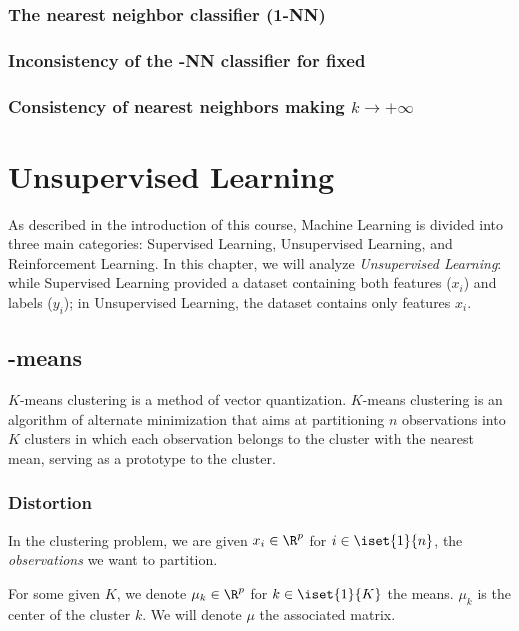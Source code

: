 \documentclass[toc, titlepaged]{../cs-classes/cs-classes}
\begin{document}
\subsubsection{The nearest neighbor classifier (1-NN)}

\subsubsection{Inconsistency of the -NN classifier for fixed }

\subsubsection{Consistency of nearest neighbors making \texorpdfstring{$k\rightarrow+\infty$}{k→+∞}}

\section{Unsupervised Learning}
As described in the introduction of this course, Machine Learning is divided into three main categories: Supervised Learning, Unsupervised Learning, and Reinforcement Learning. In this chapter, we will analyze \emph{Unsupervised Learning}: while Supervised Learning provided a dataset containing both features ($x_i$) and labels ($y_i$); in Unsupervised Learning, the dataset contains only features $x_i$.

\subsection{-means}
$K$-means clustering is a method of vector quantization. $K$-means clustering is an algorithm of alternate minimization that aims at partitioning $n$ observations into $K$ clusters in which each observation belongs to the cluster with the nearest mean, serving as a prototype to the cluster.


\subsubsection{Distortion}
\begin{definition}[Observations]
    In the clustering problem, we are given $x_i\in\R^p$ for $i\in\iset{1}{n}$, the \emph{observations} we want to partition.
\end{definition}

\begin{definition}[Means]
    For some given $K$, we denote $\mu_k\in\R^p$ for $k\in\iset{1}{K}$ the means. $\mu_k$ is the center of the cluster $k$. We will denote $\mu$ the associated matrix.
\end{definition}
\end{document}

